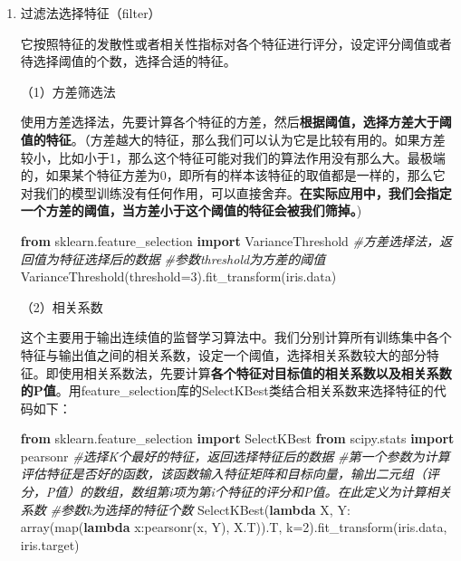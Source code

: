 \documentclass[
]{article}
\newenvironment{Shaded}{}{}
\newcommand{\BuiltInTok}[1]{\textcolor[rgb]{0.00,0.50,0.00}{#1}}
\newcommand{\CommentTok}[1]{\textcolor[rgb]{0.38,0.63,0.69}{\textit{#1}}}
\newcommand{\DecValTok}[1]{\textcolor[rgb]{0.25,0.63,0.44}{#1}}
\newcommand{\ImportTok}[1]{\textcolor[rgb]{0.00,0.50,0.00}{\textbf{#1}}}
\newcommand{\KeywordTok}[1]{\textcolor[rgb]{0.00,0.44,0.13}{\textbf{#1}}}
\newcommand{\NormalTok}[1]{#1}
\newcommand{\OperatorTok}[1]{\textcolor[rgb]{0.40,0.40,0.40}{#1}}
\begin{document}
\begin{enumerate}
\def\labelenumi{\arabic{enumi}.}
\item
  过滤法选择特征（filter）

  它按照特征的发散性或者相关性指标对各个特征进行评分，设定评分阈值或者待选择阈值的个数，选择合适的特征。

  （1）方差筛选法

  使用方差选择法，先要计算各个特征的方差，然后\textbf{根据阈值，选择方差大于阈值的特征}。（方差越大的特征，那么我们可以认为它是比较有用的。如果方差较小，比如小于1，那么这个特征可能对我们的算法作用没有那么大。最极端的，如果某个特征方差为0，即所有的样本该特征的取值都是一样的，那么它对我们的模型训练没有任何作用，可以直接舍弃。\textbf{在实际应用中，我们会指定一个方差的阈值，当方差小于这个阈值的特征会被我们筛掉。})

\begin{Shaded}
\begin{Highlighting}[]
\ImportTok{from}\NormalTok{ sklearn.feature\_selection }\ImportTok{import}\NormalTok{ VarianceThreshold}
\CommentTok{\#方差选择法，返回值为特征选择后的数据}
\CommentTok{\#参数threshold为方差的阈值}
\NormalTok{VarianceThreshold(threshold}\OperatorTok{=}\DecValTok{3}\NormalTok{).fit\_transform(iris.data)}
\end{Highlighting}
\end{Shaded}

  （2）相关系数

  这个主要用于输出连续值的监督学习算法中。我们分别计算所有训练集中各个特征与输出值之间的相关系数，设定一个阈值，选择相关系数较大的部分特征。即使用相关系数法，先要计算\textbf{各个特征对目标值的相关系数以及相关系数的P值}。用feature\_selection库的SelectKBest类结合相关系数来选择特征的代码如下：

\begin{Shaded}
\begin{Highlighting}[]
\ImportTok{from}\NormalTok{ sklearn.feature\_selection }\ImportTok{import}\NormalTok{ SelectKBest}
\ImportTok{from}\NormalTok{ scipy.stats }\ImportTok{import}\NormalTok{ pearsonr }
\CommentTok{\#选择K个最好的特征，返回选择特征后的数据}
\CommentTok{\#第一个参数为计算评估特征是否好的函数，该函数输入特征矩阵和目标向量，输出二元组（评分，P值）的数组，数组第i项为第i个特征的评分和P值。在此定义为计算相关系数}
\CommentTok{\#参数k为选择的特征个数}
\NormalTok{SelectKBest(}\KeywordTok{lambda}\NormalTok{ X, Y: array(}\BuiltInTok{map}\NormalTok{(}\KeywordTok{lambda}\NormalTok{ x:pearsonr(x, Y), X.T)).T, k}\OperatorTok{=}\DecValTok{2}\NormalTok{).fit\_transform(iris.data, iris.target)}
\end{Highlighting}
\end{Shaded}
\end{enumerate}
\end{document}
